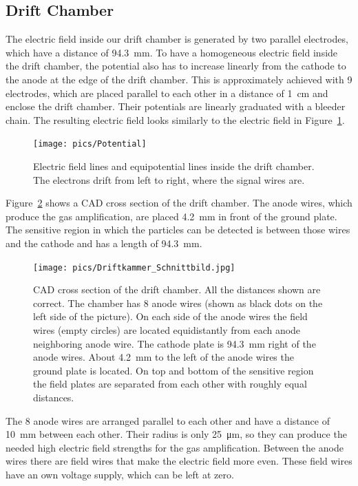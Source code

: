 \documentclass[12pt]{article}
\begin{document}
\subsection{Drift Chamber}
\label{measurementsetupdriftchamber}

The electric field inside our drift chamber is generated by two parallel electrodes, which have a distance of \SI{94.3}{\milli\meter}. To have a homogeneous electric field inside the drift chamber, the potential also has to increase linearly from the cathode to the anode at the edge of the drift chamber. This is approximately achieved with 9 electrodes, which are placed parallel to each other in a distance of \SI{1}{\centi\meter} and enclose the drift chamber. Their potentials are linearly graduated with a bleeder chain. The resulting electric field looks similarly to the electric field in Figure~\ref{fig:potential}.

\begin{figure}[h]
\texttt{[image: pics/Potential]}
\centering
\caption{Electric field lines and equipotential lines inside the drift chamber. The electrons drift from left to right, where the signal wires are.}
\label{fig:potential}
\end{figure}
 
Figure~\ref{fig:drift_chamber_cross_section} shows a CAD cross section of the drift chamber. The anode wires, which produce the gas amplification, are placed \SI{4.2}{\milli\meter} in front of the ground plate. The sensitive region in which the particles can be detected is between those wires and the cathode and has a length of \SI{94.3}{\milli\meter}.

\begin{figure}[!h]
	\texttt{[image: pics/Driftkammer\_Schnittbild.jpg]}
	\centering
	\caption{CAD cross section of the drift chamber. All the distances shown are correct. The chamber has 8 anode wires (shown as black dots on the left side of the picture). On each side of the anode wires the field wires (empty circles) are located equidistantly from each anode neighboring anode wire. The cathode plate is \SI{94.3}{\milli\meter} right of the anode wires. About \SI{4.2}{\milli\meter} to the left of the anode wires the ground plate is located. On top and bottom of the sensitive region the field plates are separated from each other with roughly equal distances.}
	\label{fig:drift_chamber_cross_section}
\end{figure}

The 8 anode wires are arranged parallel to each other and have a distance of \SI{10}{\milli\meter} between each other. Their radius is only \SI{25}{\micro\meter}, so they can produce the needed high electric field strengths for the gas amplification. Between the anode wires there are field wires that make the electric field more even. These field wires have an own voltage supply, which can be left at zero. 
\end{document}
